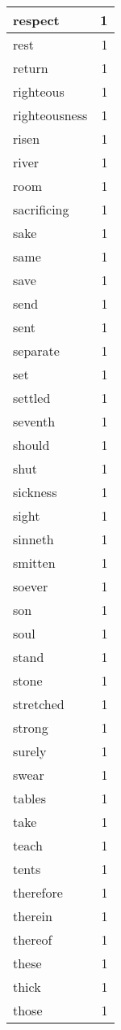 \begin{center}
\begin{longtable}{l|r}
respect & 1 \\ \hline
rest & 1 \\ \hline
return & 1 \\ \hline
righteous & 1 \\ \hline
righteousness & 1 \\ \hline
risen & 1 \\ \hline
river & 1 \\ \hline
room & 1 \\ \hline
sacrificing & 1 \\ \hline
sake & 1 \\ \hline
same & 1 \\ \hline
save & 1 \\ \hline
send & 1 \\ \hline
sent & 1 \\ \hline
separate & 1 \\ \hline
set & 1 \\ \hline
settled & 1 \\ \hline
seventh & 1 \\ \hline
should & 1 \\ \hline
shut & 1 \\ \hline
sickness & 1 \\ \hline
sight & 1 \\ \hline
sinneth & 1 \\ \hline
smitten & 1 \\ \hline
soever & 1 \\ \hline
son & 1 \\ \hline
soul & 1 \\ \hline
stand & 1 \\ \hline
stone & 1 \\ \hline
stretched & 1 \\ \hline
strong & 1 \\ \hline
surely & 1 \\ \hline
swear & 1 \\ \hline
tables & 1 \\ \hline
take & 1 \\ \hline
teach & 1 \\ \hline
tents & 1 \\ \hline
therefore & 1 \\ \hline
therein & 1 \\ \hline
thereof & 1 \\ \hline
these & 1 \\ \hline
thick & 1 \\ \hline
those & 1 \\ \hline

\end{longtable}
\end{center}
